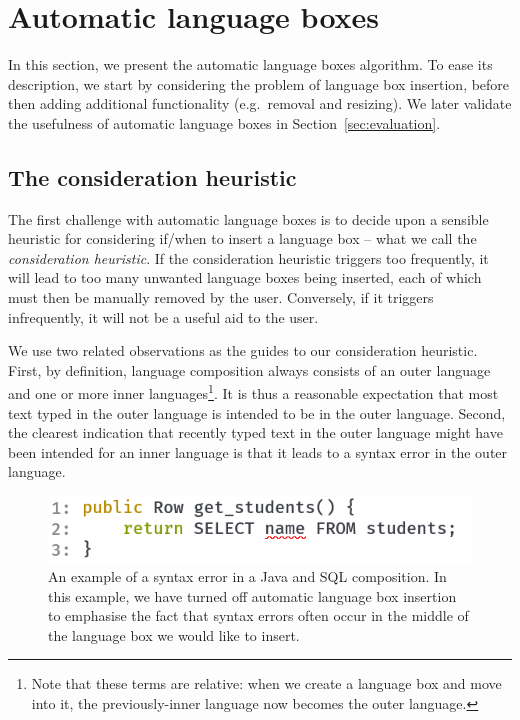 \documentclass[sigplan,screen]{acmart}\settopmatter{printfolios=true,printccs=false,printacmref=false}
\begin{document}
\section{Automatic language boxes}

In this section, we present the automatic language boxes algorithm. To ease its
description, we start by considering the problem of language box
insertion, before then adding additional functionality (e.g.~removal and
resizing). We later validate the usefulness of automatic language boxes in
Section~\ref{sec:evaluation}.


\subsection{The consideration heuristic}

The first challenge with automatic language boxes is to decide upon a sensible
heuristic for considering if/when to insert a language box -- what we call the
\emph{consideration heuristic}. If the consideration heuristic triggers too
frequently, it will lead to too many unwanted language boxes being inserted,
each of which must then be manually removed by the user.
Conversely, if it triggers infrequently, it will not be a useful aid to the user.

We use two related observations as the guides to our consideration heuristic.
First, by definition, language composition always consists of an outer language
and one or more inner languages\footnote{Note that these terms are relative:
when we create a language box and move into it, the previously-inner language
now becomes the outer language.}. It is thus a reasonable expectation that most
text typed in the outer language is intended to be in the outer language.
Second, the clearest indication that recently typed text in the outer language
might have been intended for an inner language is that it leads to a syntax error
in the outer language.

\begin{figure}[tb]
    \includegraphics[width=.40\textwidth]{images/composition_error1.png}
    \caption{An example of a syntax error in a Java and SQL composition. In
      this example, we have turned off automatic language box insertion to
      emphasise the fact that syntax errors often occur in the middle of the
      language box we would like to insert.}
\label{fig:consideration}
\end{figure}
\end{document}
